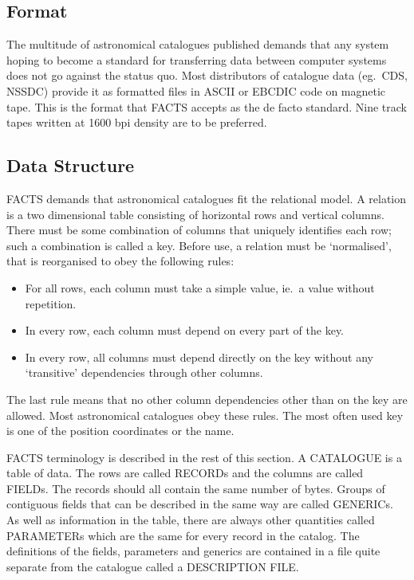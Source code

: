 \subsection {Format}
The multitude of astronomical catalogues published demands that any system
hoping to become a standard for transferring data between computer systems does
not go against the status quo.
Most distributors of catalogue data (eg.\ CDS, NSSDC) provide it as formatted
files in ASCII or EBCDIC code on magnetic tape.
This is the format that FACTS accepts as the de facto standard.
Nine track tapes written at 1600 bpi density are to be preferred.
\subsection {Data Structure}
FACTS demands that astronomical catalogues fit the relational model.
A relation is a two dimensional table consisting of horizontal rows and vertical
columns.
There must be some combination of columns that uniquely identifies each row;
such a combination is called a key.
Before use, a relation must be `normalised', that is reorganised to obey the
following rules:
\begin{itemize}
\item For all rows, each column must take a simple value, ie.\ a value without
repetition.
\item In every row, each column must depend on every part of the key.
\item In every row, all columns must depend directly on the key without any
`transitive' dependencies through other columns.
\end{itemize}
The last rule means that no other column dependencies other than on the key are
allowed.
Most astronomical catalogues obey these rules.
The most often used key is one of the position coordinates or the name.

FACTS terminology is described in the rest of this section.
A CATALOGUE is a table of data.
The rows are called RECORDs and the columns are called FIELDs.
The records should all contain the same number of bytes.
Groups of contiguous fields that can be described in the same way are called
GENERICs.
As well as information in the table, there are always other quantities called
PARAMETERs which are the same for every record in the catalog.
The definitions of the fields, parameters and generics are contained in a file
quite separate from the catalogue called a DESCRIPTION FILE.
